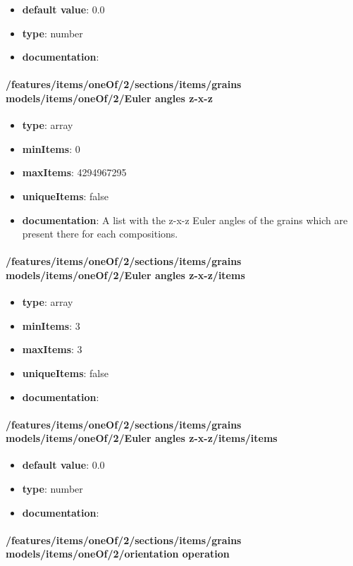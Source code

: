 \begin{itemize}\item {\bf default value}: 0.0
\item {\bf type}: number
\item {\bf documentation}: 
\end{itemize}\paragraph{/features/items/oneOf/2/sections/items/grains models/items/oneOf/2/Euler angles z-x-z}
\begin{itemize}\item {\bf type}: array
\item {\bf minItems}: 0
\item {\bf maxItems}: 4294967295
\item {\bf uniqueItems}: false
\item {\bf documentation}: A list with the z-x-z Euler angles of the grains which are present there for each compositions.
\end{itemize}\paragraph{/features/items/oneOf/2/sections/items/grains models/items/oneOf/2/Euler angles z-x-z/items}
\begin{itemize}\item {\bf type}: array
\item {\bf minItems}: 3
\item {\bf maxItems}: 3
\item {\bf uniqueItems}: false
\item {\bf documentation}: 
\end{itemize}\paragraph{/features/items/oneOf/2/sections/items/grains models/items/oneOf/2/Euler angles z-x-z/items/items}
\begin{itemize}\item {\bf default value}: 0.0
\item {\bf type}: number
\item {\bf documentation}: 
\end{itemize}\paragraph{/features/items/oneOf/2/sections/items/grains models/items/oneOf/2/orientation operation}
